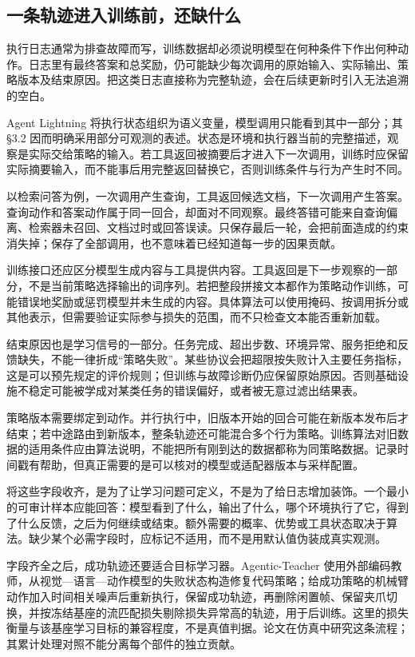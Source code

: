 \subsection{一条轨迹进入训练前，还缺什么}
\label{sec:ch11-transition}

执行日志通常为排查故障而写，训练数据却必须说明模型在何种条件下作出何种动作。日志里有最终答案和总奖励，仍可能缺少每次调用的原始输入、实际输出、策略版本及结束原因。把这类日志直接称为完整轨迹，会在后续更新时引入无法追溯的空白。

Agent Lightning 将执行状态组织为语义变量，模型调用只能看到其中一部分；其 §3.2 因而明确采用部分可观测的表述\cite{agent-lightning-2508}。状态是环境和执行器当前的完整描述，观察是实际交给策略的输入。若工具返回被摘要后才进入下一次调用，训练时应保留实际摘要输入，而不能事后用完整返回替换它，否则训练条件与行为产生时不同。

以检索问答为例，一次调用产生查询，工具返回候选文档，下一次调用产生答案。查询动作和答案动作属于同一回合，却面对不同观察。最终答错可能来自查询偏离、检索器未召回、文档过时或回答误读。只保存最后一轮，会把前面造成的约束消失掉；保存了全部调用，也不意味着已经知道每一步的因果贡献。

训练接口还应区分模型生成内容与工具提供内容。工具返回是下一步观察的一部分，不是当前策略选择输出的词序列。若把整段拼接文本都作为策略动作训练，可能错误地奖励或惩罚模型并未生成的内容。具体算法可以使用掩码、按调用拆分或其他表示，但需要验证实际参与损失的范围，而不只检查文本能否重新加载。

结束原因也是学习信号的一部分。任务完成、超出步数、环境异常、服务拒绝和反馈缺失，不能一律折成“策略失败”。某些协议会把超限按失败计入主要任务指标，这是可以预先规定的评价规则；但训练与故障诊断仍应保留原始原因。否则基础设施不稳定可能被学成对某类任务的错误偏好，或者被无意过滤出结果表。

策略版本需要绑定到动作。并行执行中，旧版本开始的回合可能在新版本发布后才结束；若中途路由到新版本，整条轨迹还可能混合多个行为策略。训练算法对旧数据的适用条件应由算法说明，不能把所有刚到达的数据都称为同策略数据。记录时间戳有帮助，但真正需要的是可以核对的模型或适配器版本与采样配置。

将这些字段收齐，是为了让学习问题可定义，不是为了给日志增加装饰。一个最小的可审计样本应能回答：模型看到了什么，输出了什么，哪个环境执行了它，得到了什么反馈，之后为何继续或结束。额外需要的概率、优势或工具状态取决于算法。缺少某个必需字段时，应标记不适用，而不是用默认值伪装成真实观测。

字段齐全之后，成功轨迹还要适合目标学习器。Agentic-Teacher 使用外部编码教师，从视觉—语言—动作模型的失败状态构造修复代码策略；给成功策略的机械臂动作加入时间相关噪声后重新执行，保留成功轨迹，再删除闲置帧、保留夹爪切换，并按冻结基座的流匹配损失剔除损失异常高的轨迹，用于后训练\cite{agentic-teacher-2611}。这里的损失衡量与该基座学习目标的兼容程度，不是真值判据。论文在仿真中研究这条流程；其累计处理对照不能分离每个部件的独立贡献。

